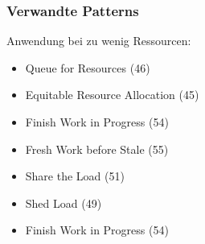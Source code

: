 \subsubsection*{Verwandte Patterns}

Anwendung bei zu wenig Ressourcen:
\begin{itemize}
	\item Queue for Resources (46)
	\item Equitable Resource Allocation (45)
	\item Finish Work in Progress (54)
\end{itemize}

\begin{itemize}
	\item Fresh Work before Stale (55)
	\item Share the Load (51)
	\item Shed Load (49)
	\item Finish Work in Progress (54)
\end{itemize}

